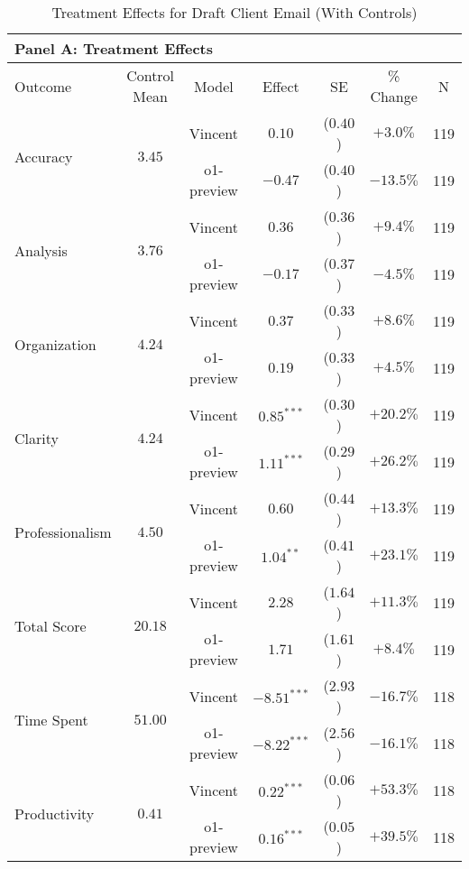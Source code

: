 \begin{table}[!htbp]
\centering
\caption{Treatment Effects for Draft Client Email (With Controls)}
\label{tab:task1_effects_controls}
\vspace{0.3cm}
\begin{tabular}{lcccccc}
\multicolumn{7}{l}{\textbf{Panel A: Treatment Effects}} \\
\hline\hline
Outcome & Control Mean & Model & Effect & SE & \% Change & N \\
\hline
\multirow{2}{*}{Accuracy} & \multirow{2}{*}{$3.45$} & Vincent & $0.10$ & ($0.40$) & $+3.0\%$ & 119 \\
& & o1-preview & $-0.47$ & ($0.40$) & $-13.5\%$ & 119 \\
\hline
\multirow{2}{*}{Analysis} & \multirow{2}{*}{$3.76$} & Vincent & $0.36$ & ($0.36$) & $+9.4\%$ & 119 \\
& & o1-preview & $-0.17$ & ($0.37$) & $-4.5\%$ & 119 \\
\hline
\multirow{2}{*}{Organization} & \multirow{2}{*}{$4.24$} & Vincent & $0.37$ & ($0.33$) & $+8.6\%$ & 119 \\
& & o1-preview & $0.19$ & ($0.33$) & $+4.5\%$ & 119 \\
\hline
\multirow{2}{*}{Clarity} & \multirow{2}{*}{$4.24$} & Vincent & $0.85^{***}$ & ($0.30$) & $+20.2\%$ & 119 \\
& & o1-preview & $1.11^{***}$ & ($0.29$) & $+26.2\%$ & 119 \\
\hline
\multirow{2}{*}{Professionalism} & \multirow{2}{*}{$4.50$} & Vincent & $0.60$ & ($0.44$) & $+13.3\%$ & 119 \\
& & o1-preview & $1.04^{**}$ & ($0.41$) & $+23.1\%$ & 119 \\
\hline
\multirow{2}{*}{Total Score} & \multirow{2}{*}{$20.18$} & Vincent & $2.28$ & ($1.64$) & $+11.3\%$ & 119 \\
& & o1-preview & $1.71$ & ($1.61$) & $+8.4\%$ & 119 \\
\hline
\multirow{2}{*}{Time Spent} & \multirow{2}{*}{$51.00$} & Vincent & $-8.51^{***}$ & ($2.93$) & $-16.7\%$ & 118 \\
& & o1-preview & $-8.22^{***}$ & ($2.56$) & $-16.1\%$ & 118 \\
\hline
\multirow{2}{*}{Productivity} & \multirow{2}{*}{$0.41$} & Vincent & $0.22^{***}$ & ($0.06$) & $+53.3\%$ & 118 \\
& & o1-preview & $0.16^{***}$ & ($0.05$) & $+39.5\%$ & 118 \\
\hline
\end{tabular}


\end{table}
